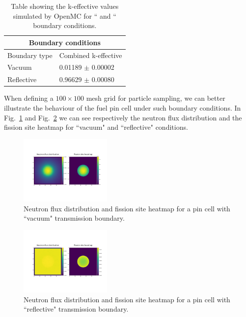 \documentclass[twocolumn,a4paper,10pt]{article}
\begin{document}
\begin{table}[ht]
\centering
\begin{tabular}{ |m{2.5cm}||m{3.5cm}|}
  \hline
  \multicolumn{2}{|c|}{Boundary conditions} \\
  \hline
  \hline
  Boundary type   &     Combined k-effective  \\
  \hline
  \hline
  Vacuum          &     0.01189 $\pm$ 0.00002   \\
  \hline
  Reflective      &     0.96629 $\pm$ 0.00080   \\
  \hline
\end{tabular}
\caption{Table showing the k-effective values simulated by OpenMC for `` and `` boundary conditions.}
\label{table:vacvsref}
\end{table}

\par
When defining a $100 \times 100$ mesh grid for particle sampling, we can better illustrate the behaviour of the fuel pin cell under such boundary conditions. In Fig.~\ref{fig:vacuum} and Fig.~\ref{fig:reflective} we can see respectively the neutron flux distribution and the fission site heatmap for ``vacuum" and ``reflective" conditions.

\begin{figure}[ht]
  \centering
  \includegraphics[width=0.4\textwidth]{../Pin_Cell/Mesh_Fuel_Pin_Cell_Vacuum.png}
  \caption{Neutron flux distribution and fission site heatmap for a pin cell with ``vacuum" transmission boundary.}
  \label{fig:vacuum}
\end{figure}

\begin{figure}[ht]
  \centering
  \includegraphics[width=0.4\textwidth]{../Pin_Cell/Mesh_Fuel_Pin_Cell_Reflective.png}
  \caption{Neutron flux distribution and fission site heatmap for a pin cell with ``reflective" transmission boundary.}
  \label{fig:reflective}
\end{figure}
\end{document}
